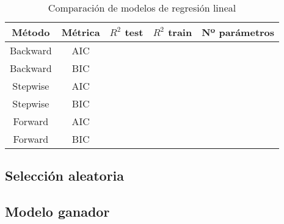 \documentclass[a4paper,onecolumn]{extarticle}
\begin{document}
\begin{sloppypar}
\begin{table}[h!]
    \begin{center}
        \begin{tabular}{ |c|c|c|c|c| } 
        \hline
        \textbf{Método} & \textbf{Métrica} & \textbf{$R^{2}$ test} & \textbf{$R^{2}$ train} & \textbf{Nº parámetros} \\
        \hline 
        Backward & AIC &  &  &  \\ 
        Backward & BIC &  &  &  \\ 
        Stepwise & AIC &  &  &  \\ 
        Stepwise & BIC &  &  &  \\ 
        Forward & AIC &  &  &  \\ 
        Forward & BIC &  &  &  \\ 
        \hline
        \end{tabular}
        \caption{Comparación de modelos de regresión lineal}
        \label{table:tablalogistica}
    \end{center}
\end{table}
\subsection{Selección aleatoria}\label{logaleatoria}
\subsection{Modelo ganador}\label{logganador}

\end{sloppypar}
\end{document}
